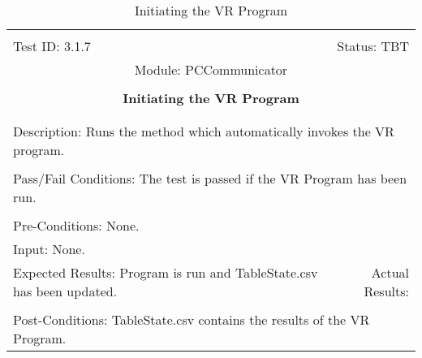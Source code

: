 \documentclass[titlepage]{article}
\begin{document}
\begin{center}%
\begin{table}[h!]
\begin{tabular}{|l r|}\hline&\\[-2mm]
	Test ID: 3.1.7	&Status: TBT\\[-3mm]
	\multicolumn{2}{|c|}{Module: PCCommunicator}\\&\\
	\multicolumn{2}{|c|}{\textbf{\large{Initiating the VR Program}}}\\&\\\hline&\\[-3mm]
	\multicolumn{2}{|p{\textwidth}|}{Description: Runs the method which automatically invokes the VR program.}\\[1mm]\hline&\\[-3mm]
	\multicolumn{2}{|p{\textwidth}|}{Pass/Fail Conditions: The test is passed if the VR Program has been run.}\\[1mm]\hline&\\[-3mm]
	\multicolumn{2}{|p{\textwidth}|}{Pre-Conditions: None.}\\[4mm]
	\multicolumn{2}{|p{\textwidth}|}{Input: None.}\\[2mm]\hline
	\multicolumn{1}{|p{0.49\textwidth}}{Expected Results: Program is run and TableState.csv has been updated.}	&\multicolumn{1}{|p{0.45\textwidth}|}{Actual Results: }\\\hline&\\[-3mm]
	\multicolumn{2}{|p{\textwidth}|}{Post-Conditions: TableState.csv contains the results of the VR Program.}\\\hline
\end{tabular}
\caption{Initiating the VR Program}
\end{table}
\end{center}
\newpage
\end{document}
